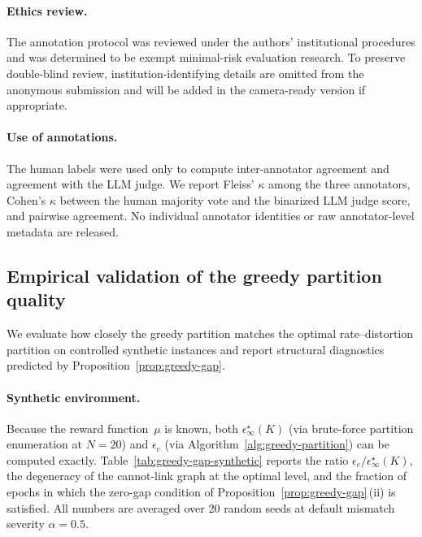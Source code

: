 \documentclass{article}
\theoremstyle{plain}
\theoremstyle{definition}
\theoremstyle{remark}
\newcommand{\eps}{\epsilon}
\begin{document}
\paragraph{Ethics review.}
The annotation protocol was reviewed under the authors' institutional procedures and was determined to be exempt minimal-risk evaluation research. To preserve double-blind review, institution-identifying details are omitted from the anonymous submission and will be added in the camera-ready version if appropriate.

\paragraph{Use of annotations.}
The human labels were used only to compute inter-annotator agreement and agreement with the LLM judge. We report Fleiss' $\kappa$ among the three annotators, Cohen's $\kappa$ between the human majority vote and the binarized LLM judge score, and pairwise agreement. No individual annotator identities or raw annotator-level metadata are released.


\subsection{Empirical validation of the greedy partition quality}
\label{app:greedy-empirical}

We evaluate how closely the greedy partition matches the optimal
rate--distortion partition on controlled synthetic instances and report
structural diagnostics predicted by Proposition~\ref{prop:greedy-gap}.

\paragraph{Synthetic environment.}
Because the reward function~$\mu$ is known, both
$\eps^\star_\infty(K)$ (via brute-force partition enumeration at
$N=20$) and $\eps_e$ (via
Algorithm~\ref{alg:greedy-partition}) can be computed exactly.
Table~\ref{tab:greedy-gap-synthetic} reports the ratio
$\eps_e/\eps^\star_\infty(K)$, the degeneracy of the cannot-link
graph at the optimal level, and the fraction of epochs in which the
zero-gap condition of Proposition~\ref{prop:greedy-gap}\,(ii) is
satisfied.
All numbers are averaged over 20 random seeds at default mismatch
severity $\alpha=0.5$.
\end{document}
